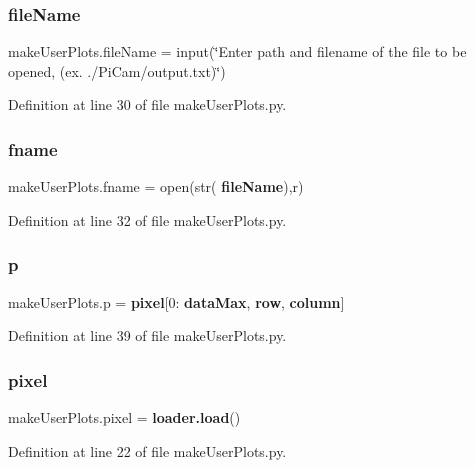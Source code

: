\subsubsection{file\+Name}
{\footnotesize\ttfamily make\+User\+Plots.\+file\+Name = input(\char`\"{}Enter path and filename of the file to be opened, (ex. \textquotesingle{}./Pi\+Cam/output.\+txt\textquotesingle{})\char`\"{})}



Definition at line 30 of file make\+User\+Plots.\+py.

\mbox{\label{namespacemake_user_plots_a99dbeefa963934bff31ca815fa512bb2}} 
\subsubsection{fname}
{\footnotesize\ttfamily make\+User\+Plots.\+fname = open(str(\textbf{ file\+Name}),\textquotesingle{}r\textquotesingle{})}



Definition at line 32 of file make\+User\+Plots.\+py.

\mbox{\label{namespacemake_user_plots_a6ceb12f38a02d348e6d136285dc69ac6}} 
\subsubsection{p}
{\footnotesize\ttfamily make\+User\+Plots.\+p = \textbf{ pixel}[0\+:\textbf{ data\+Max}, \textbf{ row}, \textbf{ column}]}



Definition at line 39 of file make\+User\+Plots.\+py.

\mbox{\label{namespacemake_user_plots_a324231a0f5e3394b5b0af89be6e3c94e}} 
\subsubsection{pixel}
{\footnotesize\ttfamily make\+User\+Plots.\+pixel = \textbf{ loader.\+load}()}



Definition at line 22 of file make\+User\+Plots.\+py.

\mbox{\label{namespacemake_user_plots_a4286bee41a8772fdd4784d0c1574acc2}} 
